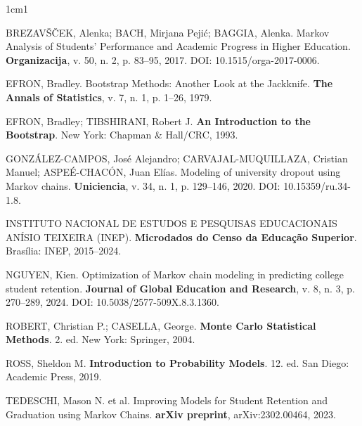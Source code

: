 \documentclass[12pt,times,article,chapter=TITLE]{abnt}
\begin{document}
\begin{hangparas}{1cm}{1}

BREZAVŠČEK, Alenka; BACH, Mirjana Pejić; BAGGIA, Alenka. Markov Analysis of Students' Performance and Academic Progress in Higher Education. \textbf{Organizacija}, v. 50, n. 2, p. 83--95, 2017. DOI: 10.1515/orga-2017-0006.

EFRON, Bradley. Bootstrap Methods: Another Look at the Jackknife. \textbf{The Annals of Statistics}, v. 7, n. 1, p. 1--26, 1979.

EFRON, Bradley; TIBSHIRANI, Robert J. \textbf{An Introduction to the Bootstrap}. New York: Chapman \& Hall/CRC, 1993.

GONZÁLEZ-CAMPOS, José Alejandro; CARVAJAL-MUQUILLAZA, Cristian Manuel; ASPEÉ-CHACÓN, Juan Elías. Modeling of university dropout using Markov chains. \textbf{Uniciencia}, v. 34, n. 1, p. 129--146, 2020. DOI: 10.15359/ru.34-1.8.

INSTITUTO NACIONAL DE ESTUDOS E PESQUISAS EDUCACIONAIS ANÍSIO TEIXEIRA (INEP). \textbf{Microdados do Censo da Educação Superior}. Brasília: INEP, 2015--2024.

NGUYEN, Kien. Optimization of Markov chain modeling in predicting college student retention. \textbf{Journal of Global Education and Research}, v. 8, n. 3, p. 270--289, 2024. DOI: 10.5038/2577-509X.8.3.1360.

ROBERT, Christian P.; CASELLA, George. \textbf{Monte Carlo Statistical Methods}. 2. ed. New York: Springer, 2004.

ROSS, Sheldon M. \textbf{Introduction to Probability Models}. 12. ed. San Diego: Academic Press, 2019.

TEDESCHI, Mason N. et al. Improving Models for Student Retention and Graduation using Markov Chains. \textbf{arXiv preprint}, arXiv:2302.00464, 2023.

\end{hangparas}
\end{document}
